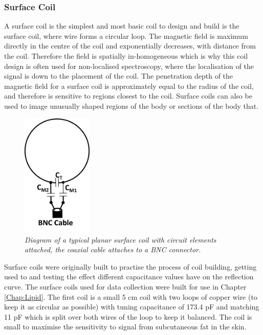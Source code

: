 \subsubsection{Surface Coil}
\label{Chap:Theory:Coils}

A surface coil is the simplest and most basic coil to design and build is the surface coil, where wire forms a circular loop. The magnetic field is maximum directly in the centre of the coil and exponentially decreases, with distance from the coil. Therefore the field is spatially in-homogeneous which is why this coil design is often used for non-localised spectroscopy, where the localisation of the signal is down to the placement of the coil. The penetration depth of the magnetic field for a surface coil is approximately equal to the radius of the coil, and therefore is sensitive to regions closest to the coil. Surface coils can also be used to image unusually shaped regions of the body or sections of the body that.

\begin{figure}
    \centering
    \includegraphics[width=0.3\textwidth]{Figures/Theory/Surface_Coil.png}
    \caption{\textit{Diagram of a typical planar surface coil with circuit elements attached, the coaxial cable attaches to a BNC connector.}}
    \label{fig:theory:Surface}
\end{figure}

Surface coils were originally built to practise the process of coil building, getting used to and testing the effect different capacitance values have on the reflection curve. The surface coils used for data collection were built for use in Chapter \ref{Chap:Lipid}. The first coil is a small 5 cm coil with two loops of copper wire (to keep it as circular as possible) with tuning capacitance of 173.4 pF and matching 11 pF which is split over both wires of the loop to keep it balanced. The coil is small to maximise the sensitivity to signal from subcutaneous fat in the skin.

